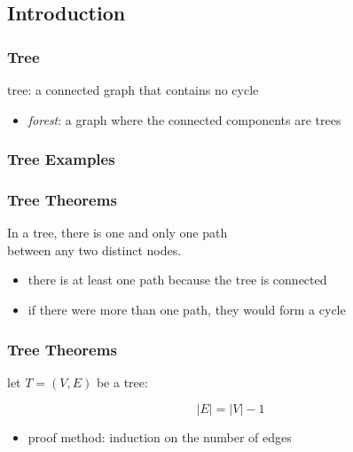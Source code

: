 \documentclass[dvipsnames]{beamer}
\begin{document}
\subsection{Introduction}

\begin{frame}
  \frametitle{Tree}

  \begin{definition}
    \alert{tree}: a connected graph that contains no cycle
  \end{definition}

  \begin{itemize}
    \item \emph{forest}: a graph where the connected components are trees
  \end{itemize}
\end{frame}

\begin{frame}
  \frametitle{Tree Examples}

  \begin{example}
    \begin{center}
    \end{center}
  \end{example}
\end{frame}

\begin{frame}
  \frametitle{Tree Theorems}

  \begin{theorem}
    In a tree, there is one and only one path\\
    between any two distinct nodes.
  \end{theorem}

  \begin{itemize}
    \item there is at least one path because the tree is connected
    \item if there were more than one path, they would form a cycle
    \medskip
    \begin{center}
    \end{center}
  \end{itemize}
\end{frame}

\begin{frame}
  \frametitle{Tree Theorems}

  \begin{theorem}
    let $T=(V,E)$ be a tree:

    \[|E| = |V| - 1\]
  \end{theorem}

  \begin{itemize}
    \item proof method: induction on the number of edges
  \end{itemize}
\end{frame}
\end{document}

